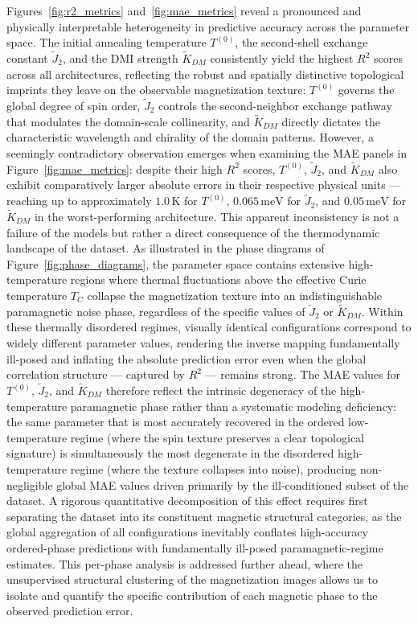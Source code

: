 \documentclass[final,5p,times,twocolumn]{elsarticle}
\begin{document}
Figures~\ref{fig:r2_metrics} and~\ref{fig:mae_metrics} reveal a
pronounced and physically interpretable heterogeneity in predictive
accuracy across the parameter space. The initial annealing temperature
$T^{(0)}$, the second-shell exchange constant $\tilde{J}_2$, and the
DMI strength $\tilde{K}_{DM}$ consistently yield the highest $R^2$
scores across all architectures, reflecting the robust and spatially
distinctive topological imprints they leave on the observable
magnetization texture: $T^{(0)}$ governs the global degree of spin
order, $\tilde{J}_2$ controls the second-neighbor exchange pathway
that modulates the domain-scale collinearity, and $\tilde{K}_{DM}$
directly dictates the characteristic wavelength and chirality of the
domain patterns. However, a seemingly contradictory observation
emerges when examining the MAE panels in Figure~\ref{fig:mae_metrics}:
despite their high $R^2$ scores, $T^{(0)}$, $\tilde{J}_2$, and
$\tilde{K}_{DM}$ also exhibit comparatively larger absolute errors in
their respective physical units --- reaching up to approximately
$1.0\,\mathrm{K}$ for $T^{(0)}$, $0.065\,\mathrm{meV}$ for
$\tilde{J}_2$, and $0.05\,\mathrm{meV}$ for $\tilde{K}_{DM}$ in the
worst-performing architecture. This apparent inconsistency is not a
failure of the models but rather a direct consequence of the
thermodynamic landscape of the dataset. As illustrated in the phase
diagrams of Figure~\ref{fig:phase_diagrams}, the parameter space
contains extensive high-temperature regions where thermal
fluctuations above the effective Curie temperature $T_C$ collapse the
magnetization texture into an indistinguishable paramagnetic noise
phase, regardless of the specific values of $\tilde{J}_2$ or
$\tilde{K}_{DM}$. Within these thermally disordered regimes, visually
identical configurations correspond to widely different parameter
values, rendering the inverse mapping fundamentally ill-posed and
inflating the absolute prediction error even when the global
correlation structure --- captured by $R^2$ --- remains strong. The
MAE values for $T^{(0)}$, $\tilde{J}_2$, and $\tilde{K}_{DM}$
therefore reflect the intrinsic degeneracy of the high-temperature
paramagnetic phase rather than a systematic modeling deficiency: the
same parameter that is most accurately recovered in the ordered
low-temperature regime (where the spin texture preserves a clear
topological signature) is simultaneously the most degenerate in the
disordered high-temperature regime (where the texture collapses into
noise), producing non-negligible global MAE values driven primarily
by the ill-conditioned subset of the dataset. A rigorous quantitative
decomposition of this effect requires first separating the dataset
into its constituent magnetic structural categories, as the global
aggregation of all configurations inevitably conflates high-accuracy
ordered-phase predictions with fundamentally ill-posed
paramagnetic-regime estimates. This per-phase analysis is addressed
further ahead, where the unsupervised structural clustering of the
magnetization images allows us to isolate and quantify the specific
contribution of each magnetic phase to the observed prediction error.
\end{document}
